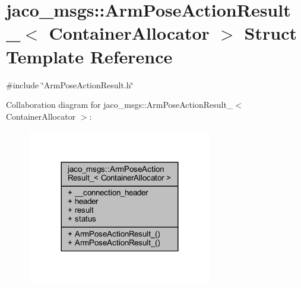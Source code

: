 \hypertarget{structjaco__msgs_1_1ArmPoseActionResult__}{}\section{jaco\+\_\+msgs\+:\+:Arm\+Pose\+Action\+Result\+\_\+$<$ Container\+Allocator $>$ Struct Template Reference}
\label{structjaco__msgs_1_1ArmPoseActionResult__}


{\ttfamily \#include \char`\"{}Arm\+Pose\+Action\+Result.\+h\char`\"{}}



Collaboration diagram for jaco\+\_\+msgs\+:\+:Arm\+Pose\+Action\+Result\+\_\+$<$ Container\+Allocator $>$\+:
\nopagebreak
\begin{figure}[H]
\begin{center}
\leavevmode
\includegraphics[width=227pt]{dc/d88/structjaco__msgs_1_1ArmPoseActionResult____coll__graph}
\end{center}
\end{figure}
